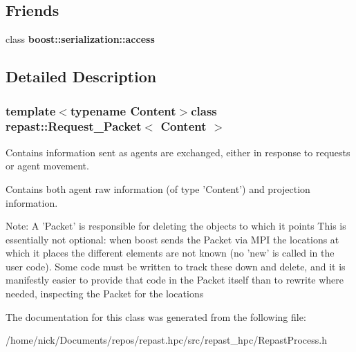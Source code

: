 \subsection*{Friends}
\begin{DoxyCompactItemize}
\item 
\hypertarget{classrepast_1_1_request___packet_ac98d07dd8f7b70e16ccb9a01abf56b9c}{class {\bfseries boost\-::serialization\-::access}}\label{classrepast_1_1_request___packet_ac98d07dd8f7b70e16ccb9a01abf56b9c}

\end{DoxyCompactItemize}


\subsection{Detailed Description}
\subsubsection*{template$<$typename Content$>$class repast\-::\-Request\-\_\-\-Packet$<$ Content $>$}

Contains information sent as agents are exchanged, either in response to requests or agent movement. 

Contains both agent raw information (of type 'Content') and projection information.

Note\-: A 'Packet' is responsible for deleting the objects to which it points This is essentially not optional\-: when boost sends the Packet via M\-P\-I the locations at which it places the different elements are not known (no 'new' is called in the user code). Some code must be written to track these down and delete, and it is manifestly easier to provide that code in the Packet itself than to rewrite where needed, inspecting the Packet for the locations 

The documentation for this class was generated from the following file\-:\begin{DoxyCompactItemize}
\item 
/home/nick/\-Documents/repos/repast.\-hpc/src/repast\-\_\-hpc/Repast\-Process.\-h\end{DoxyCompactItemize}
